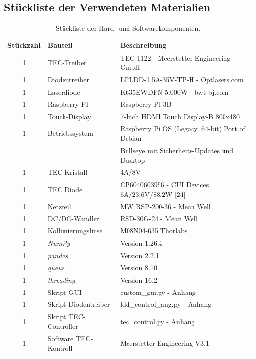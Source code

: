 \begin{appendix}
\subsection{Stückliste der Verwendeten Materialien}
\begin{table}[H]
    \centering
    \begin{tabular}{c|l|l}
        Stückzahl& \textbf{Bauteil}&       \textbf{Beschreibung}\\
        \hline
        1&          TEC-Treiber&           TEC 1122 - Meerstetter Engineering GmbH\\
        1&          Diodentreiber&         LPLDD-1,5A-35V-TP-H - Optlasers.com\\
        1&          Laserdiode&            K635EWDFN-5.000W - bwt-bj.com\\
        1&          Raspberry PI&          Raspberry PI 3B+\\
        1&          Touch-Display&         7-Inch HDMI Touch Display-B 800x480\\
        1&          Betriebssystem&        Raspberry Pi OS (Legacy, 64-bit) Port of Debian\\
        &           &                      Bullseye mit Sicherheits-Updates und Desktop\\
        1&          TEC Kristall&          4A/8V\\
        1&          TEC Diode&             CP6040603956 - CUI Devices 6A/23.6V/88.2W [24]\\
        1&          Netzteil&              MW RSP-200-36 - Mean Well\\
        1&          DC/DC-Wandler&         RSD-30G-24 - Mean Well\\
        1&          Kollimierungslinse&    M08N04-635 Thorlabs\\
        1&          \textit{NumPy}&        Version 1.26.4\\
        1&          \textit{pandas}&       Version 2.2.1\\
        1&          \textit{queue}&        Version 8.10\\
        1&          \textit{threading}&    Version 16.2\\
        1&          Skript GUI&            custom\_gui.py - Anhang\\
        1&          Skript Diodentreiber&  ldd\_control\_ang.py - Anhang\\
        1&          Skript TEC-Controller& tec\_control.py - Anhang\\
        1&          Software TEC-Kontroll& Meerstetter Engineering V3.1\\
    \end{tabular}
    \caption{Stückliste der Hard- und Softwarekomponenten.}
    \label{tab:bom}
\end{table}


\end{appendix}
